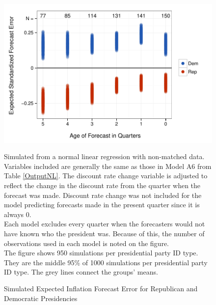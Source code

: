\documentclass[a4paper]{article}\usepackage{graphicx, color}
\newenvironment{knitrout}{}{} %
\begin{document}
\begin{figure}[t]
    \caption{Simulated Expected Inflation Forecast Error for Republican and Democratic Presidencies}
    \label{ExpectValueParty}
    \begin{center}

\begin{knitrout}
\color{fgcolor}

{\centering \includegraphics[width=0.81\linewidth]{figure/ExpectValueParty} 

}



\end{knitrout}





    \end{center}
    \begin{singlespace}
        {\scriptsize{Simulated from a normal linear regression with non-matched data. Variables included are generally the same as those in Model A6 from Table \ref{OutputNL}. The discount rate change variable is adjusted to reflect the change in the discount rate from the quarter when the forecast was made. Discount rate change was not included for the model predicting forecasts made in the present quarter since it is always 0. \\ Each model excludes every quarter when the forecasters would not have known who the president was. Because of this, the number of observations used in each model is noted on the figure. \\ The figure shows 950 simulations per presidential party ID type. They are the middle 95\% of 1000 simulations per presidential party ID type. The grey lines connect the groups' means.}}
    \end{singlespace}
\end{figure}
\end{document}
